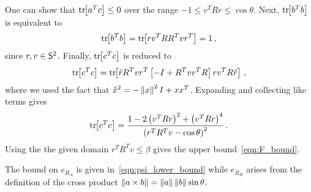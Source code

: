 \documentclass[letterpaper, 10 pt, conference]{ieeeconf}  %
\begin{document}
	One can show that \(\mathrm{tr}\negthickspace\left[ a^T c \right] \leq 0 \) over the range \( -1 \leq v^T R r \leq \cos \theta \). 
	Next, \( \mathrm{tr}\negthickspace\left[ b^T b \right]\) is equivalent to
	\begin{gather*}
		\mathrm{tr}\negthickspace\left[ b^T b \right] = \mathrm{tr}\negthickspace\left[ r v^T R R^T v r^T \right] = 1 \, ,
	\end{gather*}
	since \( r,v \in \mathsf{S}^2\).
	Finally, \( \mathrm{tr}\negthickspace\left[ c^T c \right] \) is reduced to
	\begin{gather*}
		\mathrm{tr}\negthickspace\left[ c^T c \right] = \mathrm{tr}\negthickspace\left[ \hat{r} R^T v r^T \left[ -I + R^T v v^T R \right] r v^T R \hat{r} \right] \, ,
	\end{gather*}
	where we used the fact that \( \hat{x}^2 = - \left\| x \right\|^2 I + x x^T\).
	Expanding and collecting like terms gives
	\begin{gather*}
		\mathrm{tr}\negthickspace\left[ c^T c  \right] = \frac{1 - 2\left( v^T R r \right)^2 + \left( v^T R r \right)^4}{\left( r^T R^T v - \cos \theta \right)^2} \, . 
	\end{gather*}
	Using the the given domain \( r^T R^T v \leq \beta \) gives the upper bound~\cref{eqn:F_bound}.
	
	The bound on \( e_{R_A} \) is given in~\cref{eqn:psi_lower_bound} while \( e_{R_B} \) arises from the definition of the cross product \( \left\| a \times b \right\| = \left\| a \right\| \left\| b \right\| \sin \theta \).
\end{document}
